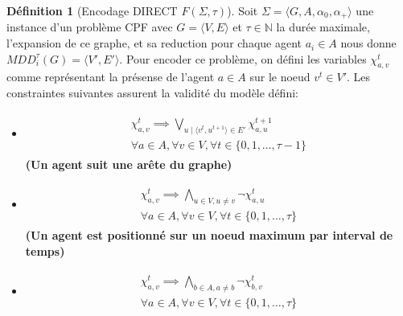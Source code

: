 \documentclass[french, 10pt, letterpaper]{article}
\theoremstyle{definition}
\newtheorem{definition}{Définition}[subsection]
\theoremstyle{proposition}
\theoremstyle{example}
\begin{document}
    \begin{definition}[Encodage DIRECT $F(\Sigma, \tau)$]
        \label{def:encoding}
        Soit $\Sigma=\langle G, A, \alpha_0, \alpha_+\rangle$ une instance d'un problème CPF avec $G = \langle V, E \rangle$ et $\tau\in \mathbb{N}$
        la durée maximale, l'expansion de ce graphe, et sa reduction pour chaque agent $a_i \in A$ nous donne $MDD^\tau_i(G) = \langle V', E' \rangle$.
        Pour encoder ce problème, on défini les variables $\chi_{a, v}^t$ comme représentant la présense de l'agent $a\in A$ sur le noeud $v^t \in V'$.
        Les constraintes suivantes assurent la validité du modèle défini:
        
        \begin{itemize}
            \item[] 
                \begin{gather}
                    \begin{split}
                        \chi_{a, v}^t \implies \bigvee_{u\;|\;\langle v^t, u^{t+1} \rangle \in E'} \chi_{a, u}^{t+1}
                        \\\forall a \in A, \forall v \in V, \forall t \in \{0, 1, \ldots, \tau-1\}
                    \end{split}
                \end{gather}
                \textbf{(Un agent suit une arête du graphe)}
            \item[] 
                \begin{gather}
                    \begin{split}
                        \chi_{a, v}^t \implies \bigwedge_{u \in V, u \neq v} \lnot \chi_{a, u}^t
                        \\\forall a \in A, \forall v \in V, \forall t \in \{0, 1, \ldots, \tau\}
                    \end{split}
                \end{gather}
                \textbf{(Un agent est positionné sur un noeud maximum par interval de temps)}
            \item[] 
                \begin{gather}
                    \begin{split}
                        \chi_{a, v}^t \implies \bigwedge_{b \in A, a \neq b} \lnot \chi_{b, v}^t
                        \\\forall a \in A, \forall v \in V, \forall t \in \{0, 1, \ldots, \tau\}
                    \end{split}

\end{gather}
\end{itemize}
\end{definition}
\end{document}
